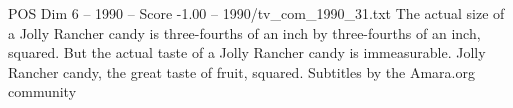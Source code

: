 \begin{textsample}{POS Dim 6 – 1990 – Score -1.00 – 1990/tv\_com\_1990\_31.txt}  \label{ex:f6_pos_078}
The actual size of a Jolly Rancher candy is three-fourths of an inch by three-fourths of an inch, squared.
But the actual taste of a Jolly Rancher candy is immeasurable.
Jolly Rancher candy, the great taste of fruit, squared.
Subtitles by the Amara.org community

\end{textsample}
